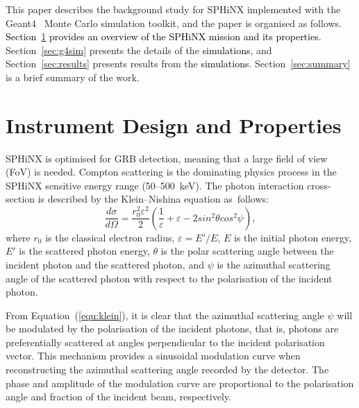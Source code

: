 \documentclass[galaxies,article,accept,moreauthors,pdftex,10pt,a4paper]{mdpi}
\begin{document}
This paper describes the background study for SPHiNX implemented with the Geant4~\cite{ref:geant4} Monte Carlo simulation toolkit, and the paper is organised as follows. \textcolor{black}{Section~\ref{sec:design} provides an overview of the SPHiNX mission and its properties.} Section~\ref{sec:g4sim} presents the details of the \textcolor{black}{simulations}, and Section~\ref{sec:results} presents results from the \textcolor{black}{simulations}. Section~\ref{sec:summary} is a brief summary of the work.

\section{Instrument Design and Properties}
\label{sec:design}

SPHiNX is optimised for GRB detection, meaning that a large field of view (FoV) is needed. Compton scattering is the dominating physics process in the SPHiNX sensitive energy range (50--500~keV). The photon interaction cross-section is described by the Klein--Nishina equation as~follows:
\begin{equation}
\frac{d\sigma}{d\Omega} = \frac{r_0^2 \varepsilon^2}{2} (\frac{1}{\varepsilon}+\varepsilon- 2sin^2\theta cos^2 \psi),
\label{equ:klein}
\end{equation}
where $r_0$ is the classical electron radius, $\varepsilon = E'/ E$, $E$ is the initial photon energy, $E'$ is the scattered photon energy, $\theta$ is the polar scattering angle between the incident photon and the scattered photon, and $\psi$ is the azimuthal scattering angle of the scattered photon with respect to the polarisation of the incident photon.

From Equation~(\ref{equ:klein}), it is clear that the azimuthal scattering angle $\psi$ will be modulated by the polarisation of the incident photons, that is, photons are preferentially scattered at angles perpendicular to the incident polarisation vector. This mechanism provides a sinusoidal modulation curve when reconstructing the azimuthal scattering angle recorded by the detector. The phase and amplitude of the modulation curve are proportional to the polarisation angle and fraction of the incident beam, respectively.
\end{document}
